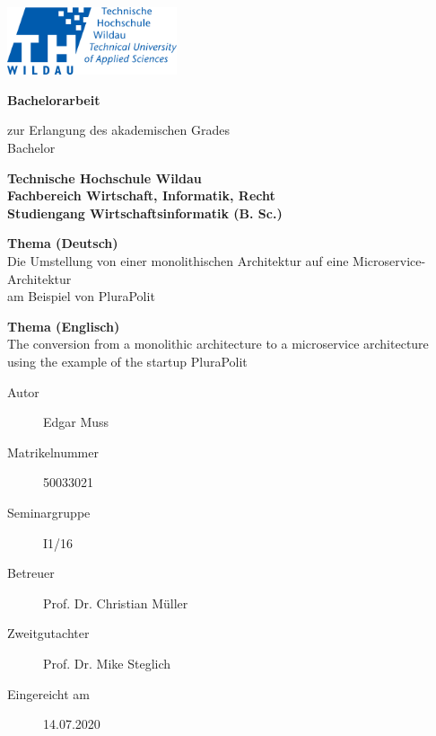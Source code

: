 \begin{titlepage}
\begin{center}

\includegraphics[width=5cm,right]{Assets/TH-Wildau-Logo_rgb}

\vspace{1cm}

\textbf{\huge
Bachelorarbeit
}
\vspace{1.3cm}
		
zur Erlangung des akademischen Grades \\
Bachelor

\vspace{2cm}

\textbf{ \large
Technische Hochschule Wildau \\
Fachbereich Wirtschaft, Informatik, Recht \\
Studiengang Wirtschaftsinformatik (B. Sc.)
}

\vspace{1.4cm}

\textbf{Thema (Deutsch)} \\
Die Umstellung von einer monolithischen Architektur auf eine Microservice-Architektur \\
am Beispiel von PluraPolit

\vspace{.5cm}

\textbf{Thema (Englisch)} \\
The conversion from a monolithic architecture to a microservice architecture \\
using the example of the startup PluraPolit

\vspace{1.5cm}

		\end{center}
\begin{description}
	\item [Autor] Edgar Muss
	\item [Matrikelnummer] 50033021
	\item [Seminargruppe] I1/16
	\item [Betreuer] Prof. Dr. Christian Müller
	\item [Zweitgutachter] Prof. Dr. Mike Steglich
	\item [Eingereicht am] 14.07.2020
\end{description}
\end{titlepage}